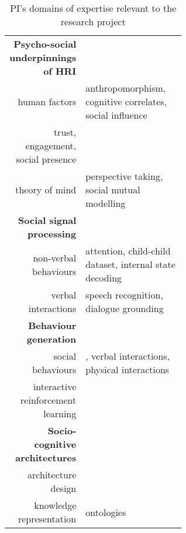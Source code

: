 \begin{table}[h!]
    \centering
    \caption{\small PI's domains of expertise relevant to the research project}
    \begin{tabular}{rp{0.6\linewidth}}
        \toprule
        \textbf{Psycho-social underpinnings of HRI} \\  
        human factors & \small anthropomorphism\cite{lemaignan2014dynamics}, cognitive
        correlates\cite{lemaignan2014cognitive}, social influence\cite{winkle2019effective} \\
        trust, engagement, social presence & \small \cite{flook2019impact}\cite{lemaignan2015youre}\cite{fink2014which}\cite{irfan2018social}\cite{wijnen2020performing} \\
        theory of mind & \small perspective taking\cite{ros2010which, warnier2012when}, social mutual modelling\cite{lemaignan2015mutual,dillenbourg2016symmetry} \\
        \midrule
        \textbf{Social signal processing}\\
        non-verbal behaviours & \small attention\cite{lemaignan2016realtime},
        child-child dataset\cite{lemaignan2018pinsoro}, internal state decoding\cite{bartlett2019what} \\
        verbal interactions & \small speech recognition\cite{kennedy2017child}, dialogue grounding\cite{lemaignan2011grounding} \\
        \midrule
        \textbf{Behaviour generation} \\
        social behaviours & \small \cite{lallee2011towards}, verbal interactions\cite{wallbridge2019generating, wallbridge2019towards}, physical interactions\cite{gharbi2013natural} \\
        interactive reinforcement learning & \small
        \cite{senft2017leveraging,senft2017supervised, senft2019teaching,  winkle2020insitu} \\
        \midrule
        \textbf{Socio-cognitive architectures} \\
        architecture design & \small \cite{lemaignan2017artificial, baxter2016cognitive,lemaignan2014challenges,lallee2012towards, mallet2010genom3} \\
        knowledge representation & \small
        ontologies~\cite{lemaignan2010oro, lemaignan2013explicit} \\

\end{tabular}
\end{table}
